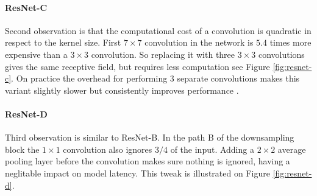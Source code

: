 

\paragraph{ResNet-C}
Second observation is that the computational cost of a convolution is quadratic in respect to the kernel size. First $7 \times 7$ convolution in the network is $5.4$ times more expensive than a $3 \times 3 $ convolution. So replacing it with three $3 \times 3 $ convolutions gives the same receptive field, but requires less computation see Figure \ref{fig:resnet-c}. On practice the overhead for performing 3 separate convolutions makes this variant slightly slower but consistently improves performance \cite{he2019_bag_of_tricks}. 



\paragraph{ResNet-D}
Third observation is similar to ResNet-B. In the path B of the downsampling block the $1 \times 1$ convolution also ignores $3/4$ of the input. Adding a $2 \times 2$ average pooling layer before the convolution makes sure nothing is ignored, having a neglitable impact on model latency. This tweak is illustrated on Figure \ref{fig:resnet-d}.

